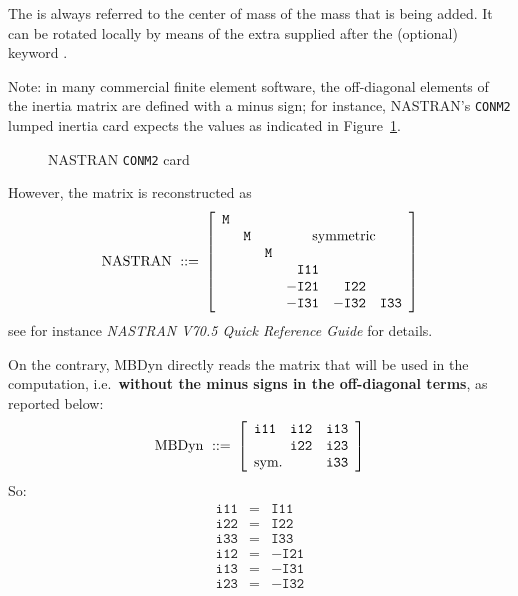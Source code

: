 The  is always referred to the center of mass of the
mass that is being added. It can be rotated locally by means of the extra
 supplied after the (optional) keyword 
.

Note: in many commercial finite element software, the off-diagonal elements 
of the inertia matrix are defined with a minus sign; for instance, 
NASTRAN's \texttt{CONM2} lumped inertia card expects the values as indicated
in Figure~\ref{fig:el:body:CONM2}.
%
\begin{figure}[b]
\centering
\begin{minipage}{120mm}
\end{minipage}
\caption{NASTRAN \texttt{CONM2} card}
\label{fig:el:body:CONM2}
\end{figure}
%
However, the matrix is reconstructed as
\begin{displaymath}
	\mathrm{NASTRAN \ ::= } \ \sqbr{\matr{rrrrrr}{
		\texttt{M} & & & & & \\
		& \texttt{M} & & \multicolumn{3}{c}{\text{symmetric}} \\
		& & \texttt{M} & & & \\
		& & & \texttt{I11} & & \\
		& & & -\texttt{I21} & \texttt{I22} & \\
		& & & -\texttt{I31} & -\texttt{I32} & \texttt{I33}
	}}
\end{displaymath}
see for instance \emph{NASTRAN V70.5 Quick Reference Guide} for details.

\noindent
On the contrary, MBDyn directly reads the matrix 
that will be used in the computation, i.e.\ 
\textbf{without the minus signs in the off-diagonal terms},
as reported below:
\begin{displaymath}
	\mathrm{MBDyn \ ::= } \ \sqbr{\matr{ccc}{
		\texttt{i11} & \texttt{i12} & \texttt{i13} \\
		& \texttt{i22} & \texttt{i23} \\
		\multicolumn{2}{l}{\text{sym.}} & \texttt{i33}
	}}
\end{displaymath}
So:
\begin{eqnarray*}
	\texttt{i11} & = & \texttt{I11} \\
	\texttt{i22} & = & \texttt{I22} \\
	\texttt{i33} & = & \texttt{I33} \\
	\texttt{i12} & = & - \texttt{I21} \\
	\texttt{i13} & = & - \texttt{I31} \\
	\texttt{i23} & = & - \texttt{I32}
\end{eqnarray*}

